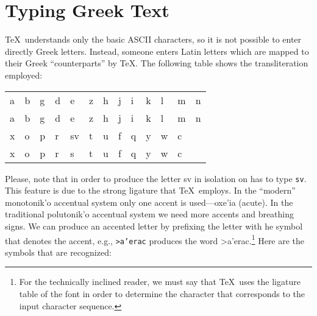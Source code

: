 \documentclass[11pt]{article}
\newcommand{\sg}{\selectlanguage{greek}}
\newcommand{\sa}{\selectlanguage{american}}
\begin{document}
\section{Typing Greek Text}
\TeX\ understands only the basic ASCII characters, so it is not possible
to enter directly Greek letters. Instead, someone enters Latin letters
which are mapped to their Greek ``counterparts'' by \TeX. The following
table shows the transliteration employed:
\begin{center}
\begin{tabular}{|lllllllllllll|}\hline
\textgreek{a}&  
\textgreek{b}&   
\textgreek{g}&  
\textgreek{d}&  
\textgreek{e}&  
\textgreek{z}&  
\textgreek{h}&  
\textgreek{j}&   
\textgreek{i}&   
\textgreek{k}&   
\textgreek{l}&   
\textgreek{m}&
\textgreek{n}\\
a& b& g& d&  e&  z&  h&  j&  i&  k&  l&  m&  n\\
\hline    
\textgreek{x}&  
\textgreek{o}&  
\textgreek{p}&  
\textgreek{r}&  
\textgreek{sv}&  
\textgreek{t}&  
\textgreek{u}&  
\textgreek{f}&  
\textgreek{q}&  
\textgreek{y}&  
\textgreek{w}& 
\textgreek{c}& \hbox{ } \\
x&  o&  p&  r&  s&   
t&  u&  f&  q&  y&  w& c& \hbox{ }\\ \hline
\end{tabular}
\end{center}
Please, note that in order to produce the letter \textgreek{sv} in isolation
on has to type \texttt{sv}. This feature is due to the strong ligature
that \TeX\ employs. 
In the ``modern'' \textgreek{monotonik'o} accentual system only one accent is 
used---\textgreek{oxe'ia} (acute). In the traditional \textgreek{polutonik'o} 
accentual system we 
need more accents and breathing signs. We can produce an accented letter by
prefixing the letter with he symbol that denotes the accent, e.g.,
\texttt{>a'erac} produces the word \sg >a'erac.\sa\footnote{For the 
technically inclined reader, we must say that \TeX\ uses the ligature table of
the font in order to determine the character that corresponds to the
input character sequence.} Here are the symbols that are recognized: 
\end{document}
